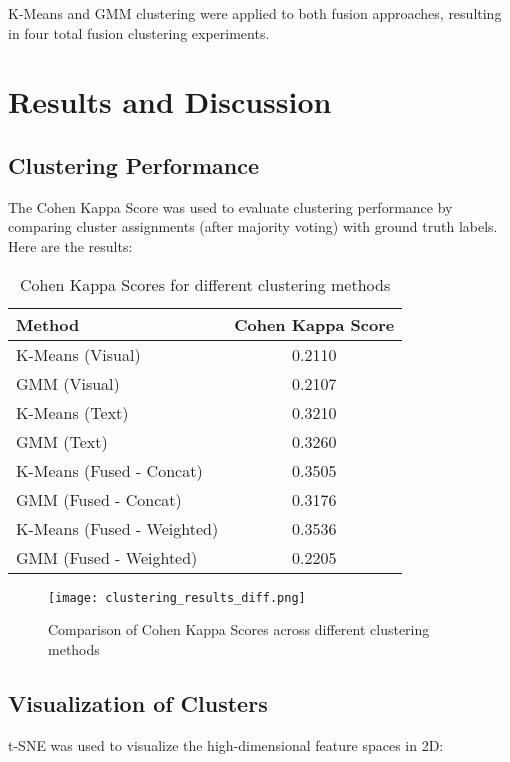 \documentclass[12pt]{article}
\begin{document}
K-Means and GMM clustering were applied to both fusion approaches, resulting in four total fusion clustering experiments.

\section{Results and Discussion}

\subsection{Clustering Performance}
The Cohen Kappa Score was used to evaluate clustering performance by comparing cluster assignments (after majority voting) with ground truth labels. Here are the results:

\begin{table}[H]
    \centering
    \begin{tabular}{lc}
        \toprule
        \textbf{Method} & \textbf{Cohen Kappa Score} \\
        \midrule
        K-Means (Visual) & 0.2110 \\
        GMM (Visual) & 0.2107 \\
        K-Means (Text) & 0.3210 \\
        GMM (Text) & 0.3260 \\
        K-Means (Fused - Concat) & 0.3505 \\
        GMM (Fused - Concat) & 0.3176 \\
        K-Means (Fused - Weighted) & 0.3536 \\
        GMM (Fused - Weighted) & 0.2205 \\
        \bottomrule
    \end{tabular}
    \caption{Cohen Kappa Scores for different clustering methods}
    \label{tab:results}
\end{table}

\begin{figure}[H]
    \centering
    \texttt{[image: clustering\_results\_diff.png]}
    \caption{Comparison of Cohen Kappa Scores across different clustering methods}
    \label{fig:results_comparison}
\end{figure}

\subsection{Visualization of Clusters}
t-SNE was used to visualize the high-dimensional feature spaces in 2D:
\end{document}
